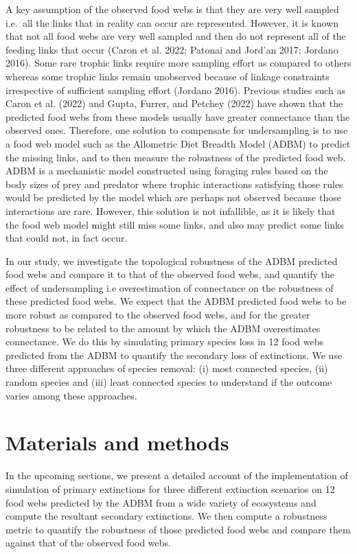 \documentclass{article}
\begin{document}
A key assumption of the observed food webs is that they are very well
sampled i.e.~all the links that in reality can occur are represented.
However, it is known that not all food webs are very well sampled and
then do not represent all of the feeding links that occur (Caron et al.
2022; Patonai and Jord'an 2017; Jordano 2016). Some rare trophic links
require more sampling effort as compared to others whereas some trophic
links remain unobserved because of linkage constraints irrespective of
sufficient sampling effort (Jordano 2016). Previous studies such as
Caron et al. (2022) and Gupta, Furrer, and Petchey (2022) have shown
that the predicted food webs from these models usually have greater
connectance than the observed ones. Therefore, one solution to
compensate for undersampling is to use a food web model such as the
Allometric Diet Breadth Model (ADBM) to predict the missing links, and
to then measure the robustness of the predicted food web. ADBM is a
mechanistic model constructed using foraging rules based on the body
sizes of prey and predator where trophic interactions satisfying those
rules would be predicted by the model which are perhaps not observed
because those interactions are rare. However, this solution is not
infallible, as it is likely that the food web model might still miss
some links, and also may predict some links that could not, in fact
occur.

In our study, we investigate the topological robustness of the ADBM
predicted food webs and compare it to that of the observed food webs,
and quantify the effect of undersampling i.e overestimation of
connectance on the robustness of these predicted food webs. We expect
that the ADBM predicted food webs to be more robust as compared to the
observed food webs, and for the greater robustness to be related to the
amount by which the ADBM overestimates connectance. We do this by
simulating primary species loss in 12 food webs predicted from the ADBM
to quantify the secondary loss of extinctions. We use three different
approaches of species removal: (i) most connected species, (ii) random
species and (iii) least connected species to understand if the outcome
varies among these approaches.

\hypertarget{materials-and-methods}{%
\section{Materials and methods}\label{materials-and-methods}}

In the upcoming sections, we present a detailed account of the
implementation of simulation of primary extinctions for three different
extinction scenarios on 12 food webs predicted by the ADBM from a wide
variety of ecosystems and compute the resultant secondary extinctions.
We then compute a robustness metric to quantify the robustness of those
predicted food webs and compare them against that of the observed food
webs.
\end{document}
